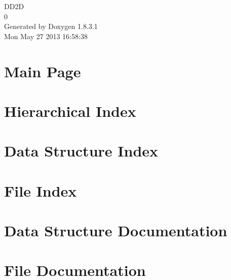 \documentclass{book}
\begin{document}
\hypersetup{pageanchor=false,citecolor=blue}
\begin{titlepage}
\vspace*{7cm}
\begin{center}
{\Large D\-D2\-D \\[1ex]\large 0 }\\
\vspace*{1cm}
{\large Generated by Doxygen 1.8.3.1}\\
\vspace*{0.5cm}
{\small Mon May 27 2013 16:58:38}\\
\end{center}
\end{titlepage}
\clearemptydoublepage
{}
\tableofcontents
\clearemptydoublepage
{}
\hypersetup{pageanchor=true,citecolor=blue}
\chapter{Main Page}
\label{index}\hypertarget{index}{}
\chapter{Hierarchical Index}

\chapter{Data Structure Index}

\chapter{File Index}

\chapter{Data Structure Documentation}








\chapter{File Documentation}




















\printindex
\end{document}
